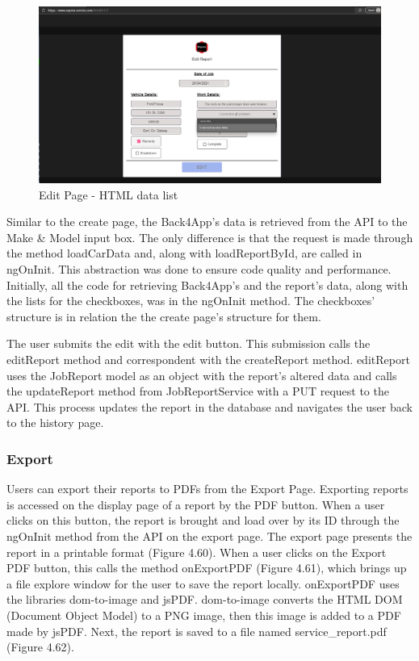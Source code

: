 \begin{figure}[H]
    \centering
    \caption{Edit Page - HTML data list}
    \label{image:EditHTMLdatalist}
    \includegraphics[width=1.0\textwidth]{images/repota/UI/edit-page.png}
\end{figure}

Similar to the create page, the Back4App's data is retrieved from the API to the Make \& Model input box. The only difference is that the request is made through the method loadCarData and, along with loadReportById, are called in ngOnInit. This abstraction was done to ensure code quality and performance. Initially, all the code for retrieving Back4App's and the report's data, along with the lists for the checkboxes, was in the ngOnInit method. The checkboxes' structure is in relation the the create page's structure for them.

The user submits the edit with the edit button. This submission calls the editReport method and correspondent with the createReport method. editReport uses the JobReport model as an object with the report's altered data and calls the updateReport method from JobReportService with a PUT request to the API. This process updates the report in the database and navigates the user back to the history page.

\subsubsection{Export}
Users can export their reports to PDFs from the Export Page. Exporting reports is accessed on the display page of a report by the PDF button. When a user clicks on this button, the report is brought and load over by its ID through the ngOnInit method from the API on the export page. The export page presents the report in a printable format (Figure 4.60). When a user clicks on the Export PDF button, this calls the method onExportPDF (Figure 4.61), which brings up a file explore window for the user to save the report locally. onExportPDF uses the libraries dom-to-image and jsPDF. dom-to-image converts the HTML DOM (Document Object Model) to a PNG image, then this image is added to a PDF made by jsPDF. Next, the report is saved to a file named service\_report.pdf (Figure 4.62).

